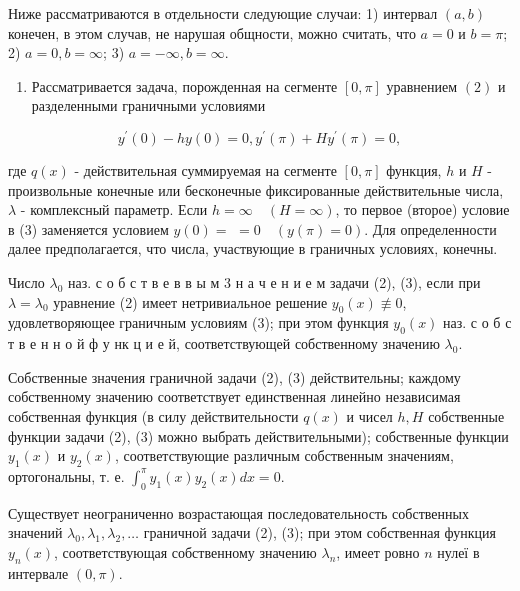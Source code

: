 \documentclass[10pt]{article}
\begin{document}
Ниже рассматриваются в отдельности следующие случаи: 1) интервал $(a, b)$ конечен, в этом случав, не нарушая общности, можно считать, что $a=0$ и $b=\pi$; 2) $a=0, b=\infty$; 3) $a=-\infty, b=\infty$.



\begin{enumerate}

  \item Рассматривается задача, порожденная на сегменте $[0, \pi]$ уравнением $(2)$ и разделенными граничными условиями

\end{enumerate}



\[

y^{\prime}(0)-h y(0)=0, y^{\prime}(\pi)+H y^{\prime}(\pi)=0,

\]



где $q(x)$ - действительная суммируемая на сегменте $[0, \pi]$ функция, $h$ и $H$ - произвольные конечные или бесконечные фиксированные действительные числа, $\lambda$ - комплексный параметр. Если $h=\infty \quad(H=\infty)$, то первое (второе) условие в (3) заменяется условием $y(0)=$ $=0 \quad(y(\pi)=0)$. Для определенности далее предполагается, что числа, участвующие в граничных условиях, конечны.



Число $\lambda_{0}$ наз. с о б с т в е в в ы м 3 н а ч е н и е м задачи (2), (3), если при $\lambda=\lambda_{0}$ уравнение (2) имеет нетривиальное решение $y_{0}(x) \not \equiv 0$, удовлетворяющее граничным условиям (3); при этом функция $y_{0}(x)$ наз. с о б с т в е н н о й ф у нк ц и е й, соответствующей собственному значению $\lambda_{0}$.



Собственные значения граничной задачи (2), (3) действительны; каждому собственному значению соответствует единственная линейно независимая собственная функция (в силу действительности $q(x)$ и чисел $h, H$ собственные функции задачи (2), (3) можно выбрать действительными); собственные функции $y_{1}(x)$ и $y_{2}(x)$, соответствующие различным собственным значениям, ортогональны, т. е. $\int_{0}^{\pi} y_{1}(x) y_{2}(x) d x=0$.



Существует неограниченно возрастающая последовательность собственных значений $\lambda_{0}, \lambda_{1}, \lambda_{2}, \ldots$ граничной задачи (2), (3); при этом собственная функция $y_{n}(x)$, соответствующая собственному значению $\lambda_{n}$, имеет ровно $n$ нулеї в интервале $(0, \pi)$.
\end{document}

